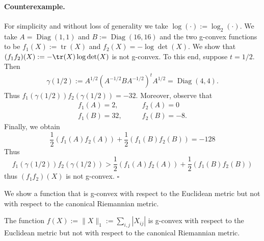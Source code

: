\documentclass[twoside,11pt]{article}
\begin{document}
\paragraph{Counterexample.}
For simplicity and without loss of generality we take $\log(\cdot) := \log_2(\cdot)$. We take $A = \operatorname{Diag}(1,1)$ and $B := \operatorname{Diag}(16, 16)$ and the two g-convex functions to be $f_1(X):= \operatorname{tr}(X)$ and $f_2(X) = - \log \det (X)$. We show that $(f_1 f_2)(X) := -\tr(X) \log \det(X)$ is not g-convex. To this end, suppose $t=1/2$. Then 
\[
\begin{aligned}
    \gamma(1/2) := A^{1/2}\left(A^{-1/2} B A^{-1/2}\right)^t A^{1/2} = \operatorname{Diag}(4, 4).
\end{aligned}
\]
Thus $f_1(\gamma(1/2)) f_2(\gamma(1/2)) = - 32.$ Moreover, observe that 
\[
\begin{aligned}
    f_1(A) = 2, \qquad & f_2(A) = 0 
    \\f_1(B) = 32, \qquad & f_2(B) = -8.
\end{aligned}
\]
Finally, we obtain 
\[
\frac{1}{2}\left(f_1(A) f_2(A) \right) + \frac{1}{2}\left(f_1(B) f_2(B) \right) = -128
\]
Thus 
\[
f_1(\gamma(1/2)) f_2(\gamma(1/2)) > \frac{1}{2}\left(f_1(A) f_2(A) \right) + \frac{1}{2}\left(f_1(B) f_2(B)\right) 
\]
thus $(f_1 f_2)(X)$ is not g-convex.
\hfill $\square$



We show a function that is g-convex with respect to the Euclidean metric but not with respect to the canonical Riemannian metric.


\begin{prop}
    The function  $f(X) := \|X\|_1 := \sum_{i,j} |X_{ij}|$ is g-convex with respect to the Euclidean metric but not with respect to the canonical Riemannian metric.
\end{prop}
\end{document}
